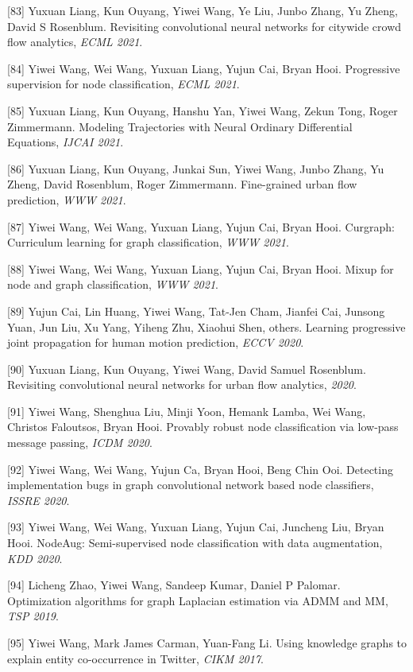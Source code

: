 [83] Yuxuan Liang, Kun Ouyang, Yiwei Wang, Ye Liu, Junbo Zhang, Yu Zheng, David S Rosenblum. Revisiting convolutional neural networks for citywide crowd flow analytics, \textit{ECML 2021}.

[84] Yiwei Wang, Wei Wang, Yuxuan Liang, Yujun Cai, Bryan Hooi. Progressive supervision for node classification, \textit{ECML 2021}.

[85] Yuxuan Liang, Kun Ouyang, Hanshu Yan, Yiwei Wang, Zekun Tong, Roger Zimmermann. Modeling Trajectories with Neural Ordinary Differential Equations, \textit{IJCAI 2021}.

[86] Yuxuan Liang, Kun Ouyang, Junkai Sun, Yiwei Wang, Junbo Zhang, Yu Zheng, David Rosenblum, Roger Zimmermann. Fine-grained urban flow prediction, \textit{WWW 2021}.

[87] Yiwei Wang, Wei Wang, Yuxuan Liang, Yujun Cai, Bryan Hooi. Curgraph: Curriculum learning for graph classification, \textit{WWW 2021}.

[88] Yiwei Wang, Wei Wang, Yuxuan Liang, Yujun Cai, Bryan Hooi. Mixup for node and graph classification, \textit{WWW 2021}.

[89] Yujun Cai, Lin Huang, Yiwei Wang, Tat-Jen Cham, Jianfei Cai, Junsong Yuan, Jun Liu, Xu Yang, Yiheng Zhu, Xiaohui Shen, others. Learning progressive joint propagation for human motion prediction, \textit{ECCV 2020}.

[90] Yuxuan Liang, Kun Ouyang, Yiwei Wang, David Samuel Rosenblum. Revisiting convolutional neural networks for urban flow analytics, \textit{ 2020}.

[91] Yiwei Wang, Shenghua Liu, Minji Yoon, Hemank Lamba, Wei Wang, Christos Faloutsos, Bryan Hooi. Provably robust node classification via low-pass message passing, \textit{ICDM 2020}.

[92] Yiwei Wang, Wei Wang, Yujun Ca, Bryan Hooi, Beng Chin Ooi. Detecting implementation bugs in graph convolutional network based node classifiers, \textit{ISSRE 2020}.

[93] Yiwei Wang, Wei Wang, Yuxuan Liang, Yujun Cai, Juncheng Liu, Bryan Hooi. NodeAug: Semi-supervised node classification with data augmentation, \textit{KDD 2020}.

[94] Licheng Zhao, Yiwei Wang, Sandeep Kumar, Daniel P Palomar. Optimization algorithms for graph Laplacian estimation via ADMM and MM, \textit{TSP 2019}.

[95] Yiwei Wang, Mark James Carman, Yuan-Fang Li. Using knowledge graphs to explain entity co-occurrence in Twitter, \textit{CIKM 2017}.